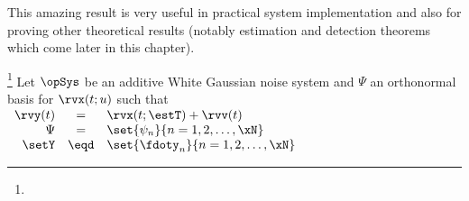 This amazing result is very useful in practical system implementation
and also for proving other theoretical results
(notably estimation and detection theorems which come later
in this chapter).


\begin{theorem}
\footnote{
  }
\label{thm:sstat}
 
  
Let $\opSys$ be an additive White Gaussian noise system and
$\Psi$ an orthonormal basis for $\rvx(t;u)$ such that
\\\indentx$\begin{array}{rcl}
     \rvy(t)&=&    \rvx(t;\estT) + \rvv(t)
   \\\Psi  &=&    \set{\psi_n}{n=1,2,\ldots,\xN}
   \\\setY &\eqd& \set{\fdoty_n}{n=1,2,\ldots,\xN}
\end{array}$
\end{theorem}
